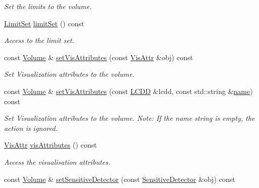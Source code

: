 \begin{DoxyCompactItemize}
\begin{DoxyCompactList}\small\item\em Set the limits to the volume. \end{DoxyCompactList}\item 
\hyperlink{class_d_d4hep_1_1_geometry_1_1_limit_set}{Limit\+Set} \hyperlink{class_d_d4hep_1_1_geometry_1_1_volume_a0b564109f4f3079cade9e50198b27392}{limit\+Set} () const
\begin{DoxyCompactList}\small\item\em Access to the limit set. \end{DoxyCompactList}\item 
const \hyperlink{class_d_d4hep_1_1_geometry_1_1_volume}{Volume} \& \hyperlink{class_d_d4hep_1_1_geometry_1_1_volume_afd5c88857ca05c4ebddc95d645ae596f}{set\+Vis\+Attributes} (const \hyperlink{class_d_d4hep_1_1_geometry_1_1_vis_attr}{Vis\+Attr} \&obj) const
\begin{DoxyCompactList}\small\item\em Set Visualization attributes to the volume. \end{DoxyCompactList}\item 
const \hyperlink{class_d_d4hep_1_1_geometry_1_1_volume}{Volume} \& \hyperlink{class_d_d4hep_1_1_geometry_1_1_volume_ae1d11f7a5aea7e2c7143d8ee7c4b53b7}{set\+Vis\+Attributes} (const \hyperlink{class_d_d4hep_1_1_geometry_1_1_l_c_d_d}{L\+C\+DD} \&lcdd, const std\+::string \&\hyperlink{class_d_d4hep_1_1_handle_a27c7d467a609ab32c133e1f3c7d85ef5}{name}) const
\begin{DoxyCompactList}\small\item\em Set Visualization attributes to the volume. Note\+: If the name string is empty, the action is ignored. \end{DoxyCompactList}\item 
\hyperlink{class_d_d4hep_1_1_geometry_1_1_vis_attr}{Vis\+Attr} \hyperlink{class_d_d4hep_1_1_geometry_1_1_volume_ab1e85c2a3a77ad8474f8be4d1e6ae8f8}{vis\+Attributes} () const
\begin{DoxyCompactList}\small\item\em Access the visualisation attributes. \end{DoxyCompactList}\item 
const \hyperlink{class_d_d4hep_1_1_geometry_1_1_volume}{Volume} \& \hyperlink{class_d_d4hep_1_1_geometry_1_1_volume_a06a520c22504fac9688544011c19744e}{set\+Sensitive\+Detector} (const \hyperlink{class_d_d4hep_1_1_geometry_1_1_sensitive_detector}{Sensitive\+Detector} \&obj) const

\end{DoxyCompactItemize}
